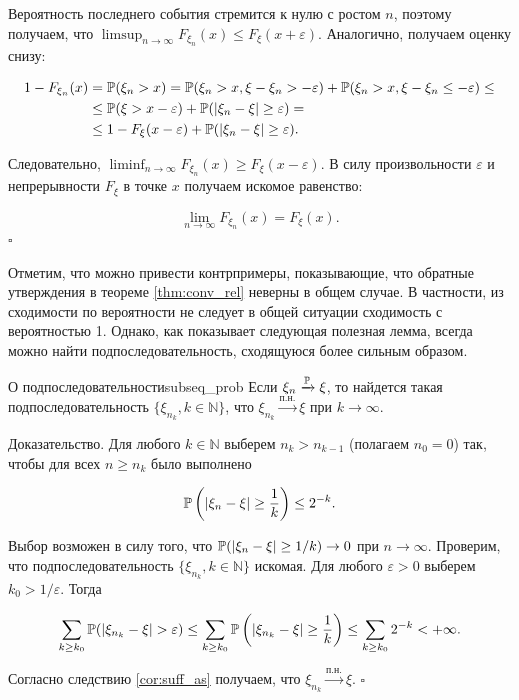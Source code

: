 Вероятность последнего события стремится к нулю с ростом $n$, поэтому получаем, что $\limsup_{n \to \infty} F_{\xi_n}(x) \le F_\xi(x + \varepsilon)$. Аналогично, получаем оценку снизу:

\begin{align*}
1 - F_{\xi_n}(x) &= \P(\xi_n > x) = \P(\xi_n > x, \xi - \xi_n > -\varepsilon) + \P(\xi_n > x, \xi - \xi_n \le -\varepsilon) \le \\
&\le \P(\xi > x - \varepsilon) + \P(|\xi_n - \xi| \ge \varepsilon) = \\
&\le 1 - F_\xi(x - \varepsilon) + \P(|\xi_n - \xi| \ge \varepsilon).
\end{align*}

Следовательно, $\liminf_{n \to \infty} F_{\xi_n}(x) \ge F_\xi(x - \varepsilon)$. В силу произвольности $\varepsilon$ и непрерывности $F_\xi$ в точке $x$ получаем искомое равенство:

$$ \lim_{n \to \infty} F_{\xi_n}(x) = F_\xi(x). $$
\hfill$\square$

Отметим, что можно привести контрпримеры, показывающие, что обратные утверждения в теореме \ref{thm:conv_rel} неверны в общем случае. В частности, из сходимости по вероятности не следует в общей ситуации сходимость с вероятностью 1. Однако, как показывает следующая полезная лемма, всегда можно найти подпоследовательность, сходящуюся более сильным образом.

\begin{lemma}{О подпоследовательности}{subseq_prob}
    Если $\xi_n \xrightarrow{\P} \xi$, то найдется такая подпоследовательность $\{\xi_{n_k}, k \in \mathbb{N}\}$, что $\xi_{n_k} \xrightarrow{\text{п.н.}} \xi$ при $k \to \infty$.
\end{lemma}

Доказательство. Для любого $k \in \mathbb{N}$ выберем $n_k > n_{k-1}$ (полагаем $n_0 = 0$) так, чтобы для всех $n \ge n_k$ было выполнено

$$ \P\left(|\xi_n - \xi| \ge \frac{1}{k}\right) \le 2^{-k}. $$

Выбор возможен в силу того, что $\P(|\xi_n - \xi| \ge 1/k) \to 0$ при $n \to \infty$. Проверим, что подпоследовательность $\{\xi_{n_k}, k \in \mathbb{N}\}$ искомая. Для любого $\varepsilon > 0$ выберем $k_0 > 1/\varepsilon$. Тогда

$$ \sum_{k \ge k_0} \P(|\xi_{n_k} - \xi| > \varepsilon) \le \sum_{k \ge k_0} \P\left(|\xi_{n_k} - \xi| \ge \frac{1}{k}\right) \le \sum_{k \ge k_0} 2^{-k} < +\infty. $$

Согласно следствию \ref{cor:suff_as} получаем, что $\xi_{n_k} \xrightarrow{\text{п.н.}} \xi$. \hfill$\square$

